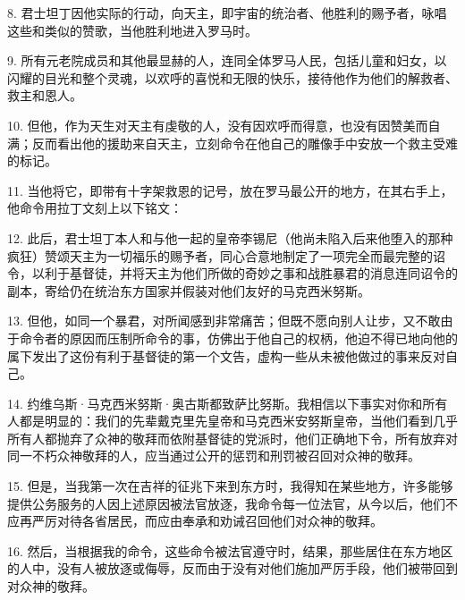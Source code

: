 8. 君士坦丁因他实际的行动，向天主，即宇宙的统治者、他胜利的赐予者，咏唱这些和类似的赞歌，当他胜利地进入罗马时。\par

9. 所有元老院成员和其他最显赫的人，连同全体罗马人民，包括儿童和妇女，以闪耀的目光和整个灵魂，以欢呼的喜悦和无限的快乐，接待他作为他们的解救者、救主和恩人。\par

10. 但他，作为天生对天主有虔敬的人，没有因欢呼而得意，也没有因赞美而自满；反而看出他的援助来自天主，立刻命令在他自己的雕像手中安放一个救主受难的标记。\par

11. 当他将它，即带有十字架救恩的记号，放在罗马最公开的地方，在其右手上，他命令用拉丁文刻上以下铭文：\par

12. 此后，君士坦丁本人和与他一起的皇帝李锡尼（他尚未陷入后来他堕入的那种疯狂）赞颂天主为一切福乐的赐予者，同心合意地制定了一项完全而最完整的诏令，以利于基督徒，并将天主为他们所做的奇妙之事和战胜暴君的消息连同诏令的副本，寄给仍在统治东方国家并假装对他们友好的马克西米努斯。\par

13. 但他，如同一个暴君，对所闻感到非常痛苦；但既不愿向别人让步，又不敢由于命令者的原因而压制所命令的事，仿佛出于他自己的权柄，他迫不得已地向他的属下发出了这份有利于基督徒的第一个文告，虚构一些从未被他做过的事来反对自己。\par

\par

14. 约维乌斯·马克西米努斯·奥古斯都致萨比努斯。我相信以下事实对你和所有人都是明显的：我们的先辈戴克里先皇帝和马克西米安努斯皇帝，当他们看到几乎所有人都抛弃了众神的敬拜而依附基督徒的党派时，他们正确地下令，所有放弃对同一不朽众神敬拜的人，应当通过公开的惩罚和刑罚被召回对众神的敬拜。\par

15. 但是，当我第一次在吉祥的征兆下来到东方时，我得知在某些地方，许多能够提供公务服务的人因上述原因被法官放逐，我命令每一位法官，从今以后，他们不应再严厉对待各省居民，而应由奉承和劝诫召回他们对众神的敬拜。\par

16. 然后，当根据我的命令，这些命令被法官遵守时，结果，那些居住在东方地区的人中，没有人被放逐或侮辱，反而由于没有对他们施加严厉手段，他们被带回到对众神的敬拜。\par

